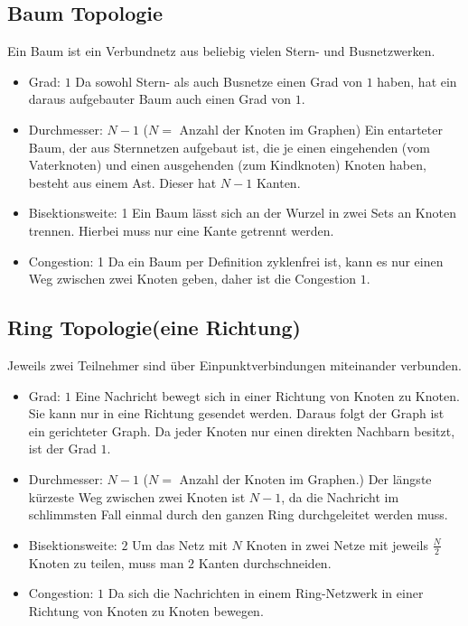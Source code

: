 \subsection{Baum Topologie}
Ein Baum ist ein Verbundnetz aus beliebig vielen Stern- und Busnetzwerken.
\begin{itemize}
  \item Grad: $1$
  \newline Da sowohl Stern- als auch Busnetze einen Grad von $1$ haben, hat ein
  daraus aufgebauter Baum auch einen Grad von $1$.
  \item Durchmesser: $N-1$ ($N =$ Anzahl der Knoten im Graphen)
   \newline Ein entarteter Baum, der aus Sternnetzen aufgebaut ist, die je einen
   eingehenden (vom Vaterknoten) und einen ausgehenden (zum Kindknoten) Knoten
   haben, besteht aus einem Ast. Dieser hat $N-1$ Kanten.
  \item Bisektionsweite: 1
  \newline Ein Baum lässt sich an der Wurzel in zwei Sets an Knoten trennen.
  Hierbei muss nur eine Kante getrennt werden.
  \item Congestion: 1
  \newline Da ein Baum per Definition zyklenfrei ist, kann es nur einen Weg
  zwischen zwei Knoten geben, daher ist die Congestion $1$.
\end{itemize}

\subsection{Ring Topologie(eine Richtung)}
 Jeweils zwei Teilnehmer sind über Einpunktverbindungen miteinander verbunden.
\begin{itemize}
  \item Grad: $1$
  \newline Eine Nachricht bewegt sich in einer Richtung von Knoten zu Knoten. 
  Sie kann nur in eine Richtung gesendet werden. Daraus folgt der Graph ist ein
  gerichteter Graph. Da jeder Knoten nur einen direkten Nachbarn besitzt, ist
  der Grad $1$.
  \item Durchmesser: $N-1$ ($N =$ Anzahl der Knoten im Graphen.)
   \newline Der längste kürzeste Weg zwischen zwei Knoten ist $N-1$, da die
   Nachricht im schlimmsten Fall einmal durch den ganzen Ring durchgeleitet
   werden muss.
  \item Bisektionsweite: $2$
  \newline  Um das Netz mit $N$ Knoten in zwei Netze mit jeweils $\frac{N}{2}$
  Knoten zu teilen, muss man $2$ Kanten durchschneiden.
  \item Congestion: $1$
  \newline Da sich die Nachrichten in einem Ring-Netzwerk in einer Richtung von
  Knoten zu Knoten bewegen.
\end{itemize}

